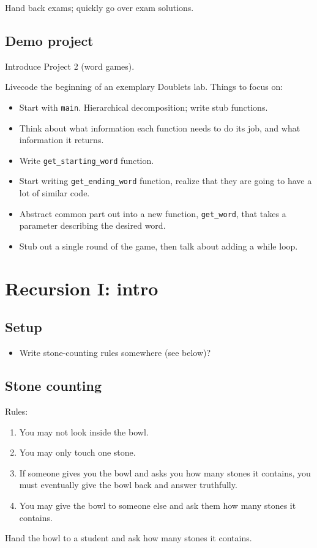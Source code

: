 \documentclass{article}
\begin{document}
Hand back exams; quickly go over exam solutions.

\subsection*{Demo project}

Introduce Project 2 (word games).

Livecode the beginning of an exemplary Doublets lab.  Things to focus
on:
\begin{itemize}
\item Start with \verb|main|.  Hierarchical decomposition; write stub
  functions.
\item Think about what information each function needs to do its job,
  and what information it returns.
\item Write \verb|get_starting_word| function.
\item Start writing \verb|get_ending_word| function, realize that they
  are going to have a lot of similar code.
\item Abstract common part out into a new function, \verb|get_word|,
  that takes a parameter describing the desired word.
\item Stub out a single round of the game, then talk about adding a
  while loop.
\end{itemize}

\section{Recursion I: intro}

\subsection*{Setup}
\begin{itemize}
\item Write stone-counting rules somewhere (see below)?
\end{itemize}

\subsection*{Stone counting}

Rules:
\begin{enumerate}
\item You may not look inside the bowl.
\item You may only touch one stone.
\item If someone gives you the bowl and asks you how many stones it
  contains, you must eventually give the bowl back and answer
  truthfully.
\item You may give the bowl to someone else and ask them how many
  stones it contains.
\end{enumerate}
Hand the bowl to a student and ask how many stones it contains.
\end{document}
